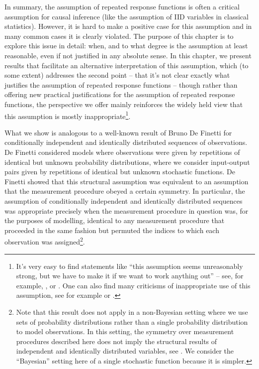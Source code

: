In summary, the assumption of repeated response functions is often a critical assumption for causal inference (like the assumption of IID variables in classical statistics). However, it is hard to make a positive case for this assumption and in many common cases it is clearly violated. The purpose of this chapter is to explore this issue in detail: when, and to what degree is the assumption at least reasonable, even if not justified in any absolute sense. In this chapter, we present results that facilitate an alternative interpretation of this assumption, which (to some extent) addresses the second point -- that it's not clear exactly what justifies the assumption of repeated response functions -- though rather than offering new practical justifications for the assumption of repeated response functions, the perspective we offer mainly reinforces the widely held view that this assumption is mostly inappropriate\footnote{It's very easy to find statements like ``this assumption seems unreasonably strong, but we have to make it if we want to work anything out'' -- see, for example, \citet[~pg. 11]{saarela_role_2020}, \citet[~pg. 579]{hernan_estimating_2006} or \citet[~pg. 40]{pearl_causality:_2009}. One can also find many criticisms of inappropriate use of this assumption, see for example \citet{muller_causal_2015} or \citet{berk_what_2010}.}.

What we show is analogous to a well-known result of Bruno De Finetti for conditionally independent and identically distributed sequences of observations. De Finetti considered models where observations were given by repetitions of identical but unknown probability distributions, where we consider input-output pairs given by repetitions of identical but unknown stochastic functions. De Finetti showed that this structural assumption was equivalent to an assumption that the measurement procedure obeyed a certain symmetry. In particular, the assumption of conditionally independent and identically distributed sequences was appropriate precisely when the measurement procedure in question was, for the purposes of modelling, identical to any measurement procedure that proceeded in the same fashion but permuted the indices to which each observation was assigned\footnote{Note that this result does not apply in a non-Bayesian setting where we use sets of probability distributions rather than a single probability distribution to model observations. In this setting, the symmetry over measurement procedures described here does not imply the structural results of independent and identically distributed variables, see \citet[pg. 463]{walley_statistical_1991}. We consider the ``Bayesian'' setting here of a single stochastic function because it is simpler.}.

